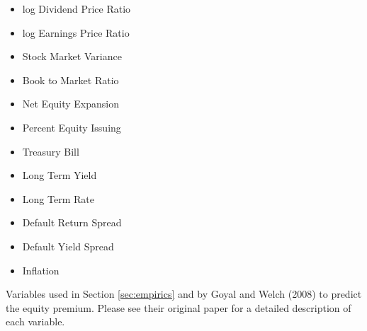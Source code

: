 \documentclass[11pt]{article}
\begin{document}
\begin{table}
  \centering
  \begin{itemize}
  \item log Dividend Price Ratio
  \item log Earnings Price Ratio
  \item Stock Market Variance
  \item Book to Market Ratio
  \item Net Equity Expansion
  \item Percent Equity Issuing
  \item Treasury Bill
  \item Long Term Yield
  \item Long Term Rate
  \item Default Return Spread
  \item Default Yield Spread
  \item Inflation
  \end{itemize}
  \caption{Variables used in Section \ref{sec:empirics} and by Goyal
    and Welch (2008) to predict the equity premium.  Please see their
    original paper for a detailed description of each variable.}
  \label{tab:equity}
\end{table}


\end{document}
